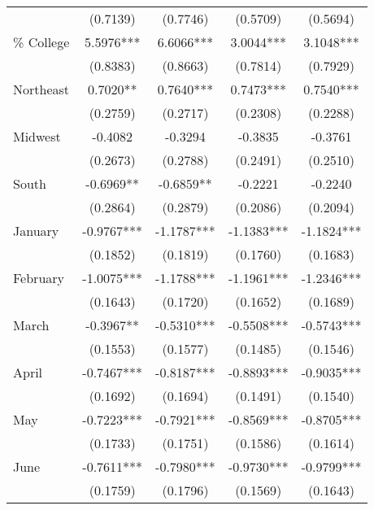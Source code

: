 \begin{table}[htbp]
\begin{tabular}{l*{4}{c}}
                    &    (0.7139)   &    (0.7746)   &    (0.5709)   &    (0.5694)   \\
\% College          &      5.5976***&      6.6066***&      3.0044***&      3.1048***\\
                    &    (0.8383)   &    (0.8663)   &    (0.7814)   &    (0.7929)   \\
Northeast           &      0.7020** &      0.7640***&      0.7473***&      0.7540***\\
                    &    (0.2759)   &    (0.2717)   &    (0.2308)   &    (0.2288)   \\
Midwest             &     -0.4082   &     -0.3294   &     -0.3835   &     -0.3761   \\
                    &    (0.2673)   &    (0.2788)   &    (0.2491)   &    (0.2510)   \\
South               &     -0.6969** &     -0.6859** &     -0.2221   &     -0.2240   \\
                    &    (0.2864)   &    (0.2879)   &    (0.2086)   &    (0.2094)   \\
January             &     -0.9767***&     -1.1787***&     -1.1383***&     -1.1824***\\
                    &    (0.1852)   &    (0.1819)   &    (0.1760)   &    (0.1683)   \\
February            &     -1.0075***&     -1.1788***&     -1.1961***&     -1.2346***\\
                    &    (0.1643)   &    (0.1720)   &    (0.1652)   &    (0.1689)   \\
March               &     -0.3967** &     -0.5310***&     -0.5508***&     -0.5743***\\
                    &    (0.1553)   &    (0.1577)   &    (0.1485)   &    (0.1546)   \\
April               &     -0.7467***&     -0.8187***&     -0.8893***&     -0.9035***\\
                    &    (0.1692)   &    (0.1694)   &    (0.1491)   &    (0.1540)   \\
May                 &     -0.7223***&     -0.7921***&     -0.8569***&     -0.8705***\\
                    &    (0.1733)   &    (0.1751)   &    (0.1586)   &    (0.1614)   \\
June                &     -0.7611***&     -0.7980***&     -0.9730***&     -0.9799***\\
                    &    (0.1759)   &    (0.1796)   &    (0.1569)   &    (0.1643)   \\

\end{tabular}
\end{table}
